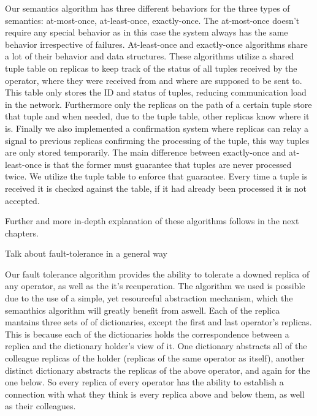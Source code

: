 \documentclass[times, 10pt,twocolumn]{article}
\begin{document}
	Our semantics algorithm has three different behaviors for the three types 
of semantics: at-most-once, at-least-once, exactly-once. The at-most-once
doesn't require any special behavior as in this case the system always has the same 
behavior irrespective of failures. At-least-once and exactly-once algorithms share 
a lot of their behavior and data structures. These algorithms utilize a shared tuple table
on replicas to keep track of the status of all tuples received by the operator, 
where they were received from and where are supposed to be sent to. This
table only stores the ID and status of tuples, reducing communication load in the
network. Furthermore only the replicas on the path of a certain tuple store that tuple 
and when needed, due to the tuple table, other replicas know where it is. Finally we also
implemented a confirmation system where replicas can relay a signal to previous replicas
confirming the processing of the tuple, this way tuples are only stored temporarily. 
The main difference between exactly-once and at-least-once is that the former 
must guarantee that tuples are never processed twice. We utilize the tuple table
to enforce that guarantee. Every time a tuple is received it is checked against the 
table, if it had already been processed it is not accepted. 

	Further and more in-depth explanation of these algorithms follows in the next chapters.


Talk about fault-tolerance in a general way

Our fault tolerance algorithm provides the ability to tolerate a downed replica of any operator, as well as the it's recuperation.
The algorithm we used is possible due to the use of a simple, yet resourceful abstraction mechanism, which the semanthics algorithm will greatly benefit from aswell.
Each of the replica mantains three sets of of dictionaries, except the first and last operator's replicas. This is because each of the dictionaries holds the correspondence between a replica and the dictionary holder's view of it.
One dictionary abstracts all of the colleague replicas of the holder (replicas of the same operator as itself), another distinct dictionary abstracts the replicas of the above operator, and again for the one below.
So every replica of every operator has the ability to establish a connection with what they think is every replica above and below them, as well as their colleagues.
\end{document}
